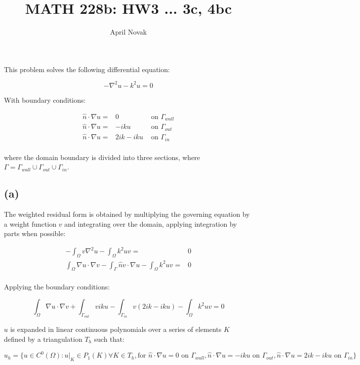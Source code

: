 \documentclass[10pt]{article}
\newcommand{\beq}{\begin{equation}}
\newcommand{\eeq}{\end{equation}}
\newcommand{\beqa}{\begin{equation}\begin{aligned}}
\newcommand{\eeqa}{\end{aligned}\end{equation}}
\begin{document}
\title{MATH 228b: HW3 ... 3c, 4bc}
\author{April Novak}

\maketitle

\section{}

This problem solves the following differential equation:

\beq
\label{eq:prob}
-\nabla^2 u-k^2u=0
\eeq

With boundary conditions:

\beqa
\label{eq:BCs}
\hat{n}\cdot\nabla u=&0 & \textrm{ on } \Gamma_{wall}\\
\hat{n}\cdot\nabla u=&-iku & \textrm{ on } \Gamma_{out}\\
\hat{n}\cdot\nabla u=&2ik-iku & \textrm{ on } \Gamma_{in}\\
\eeqa

where the domain boundary is divided into three sections, where \(\Gamma=\Gamma_{wall}\cup\Gamma_{out}\cup\Gamma_{in}\). 

\subsection{(a)}

The weighted residual form is obtained by multiplying the governing equation by a weight function \(v\) and integrating over the domain, applying integration by parts when possible:

\beqa
-\int_{\Omega}v\nabla^2 u-\int_{\Omega}k^2uv=& 0\\
\int_{\Omega}\nabla u\cdot\nabla v-\int_{\Gamma}\hat{n}v\cdot\nabla u-\int_{\Omega}k^2uv=&0\\
\eeqa

Applying the boundary conditions:

\beq
\int_{\Omega}\nabla u\cdot\nabla v+\int_{\Gamma_{out}}viku-\int_{\Gamma_{in}}v(2ik-iku)-\int_{\Omega}k^2uv=0
\eeq

\(u\) is expanded in linear continuous polynomials over a series of elements \(K\) defined by a triangulation \(T_h\) such that:

\beq
u_h=\{u\in C^0(\Omega):u\rvert_K\in P_1(K)\forall K\in T_h, \textrm{for } \hat{n}\cdot\nabla u=0 \textrm{ on } \Gamma_{wall}, \hat{n}\cdot\nabla u=-iku \textrm{ on } \Gamma_{out}, \hat{n}\cdot\nabla u=2ik-iku \textrm{ on } \Gamma_{in}\}
\eeq
\end{document}
